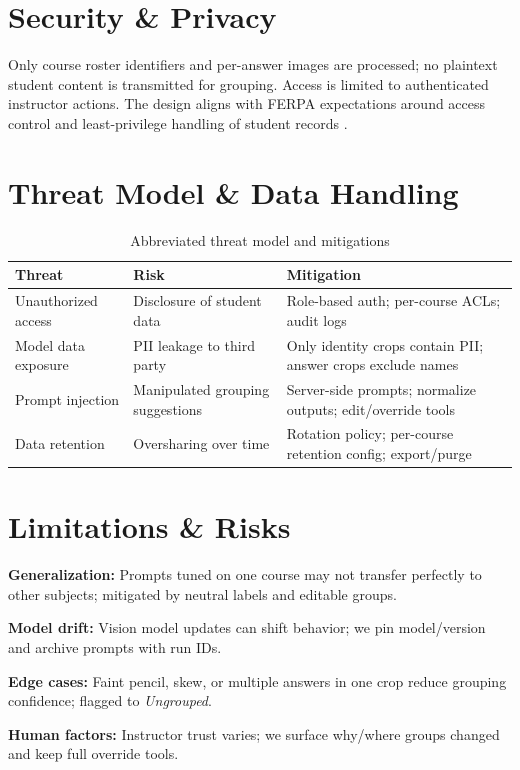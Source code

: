 \documentclass[ms,twoside,print]{nuthesis}
\begin{document}
\section{Security \& Privacy}
Only course roster identifiers and per-answer images are processed; no plaintext student content is transmitted for grouping. Access is limited to authenticated instructor actions. The design aligns with FERPA expectations around access control and least-privilege handling of student records \cite{FERPA1974}.

\section{Threat Model \& Data Handling}
\begin{table}[H]\centering
\caption{Abbreviated threat model and mitigations}\label{tab:threats}
\begin{tabularx}{\textwidth}{@{}p{3.8cm}Xp{4.6cm}@{}}
\toprule
\textbf{Threat} & \textbf{Risk} & \textbf{Mitigation} \\
\midrule
Unauthorized access & Disclosure of student data & Role-based auth; per-course ACLs; audit logs \\
Model data exposure & PII leakage to third party & Only identity crops contain PII; answer crops exclude names \\
Prompt injection & Manipulated grouping suggestions & Server-side prompts; normalize outputs; edit/override tools \\
Data retention & Oversharing over time & Rotation policy; per-course retention config; export/purge \\
\bottomrule
\end{tabularx}
\end{table}

\section{Limitations \& Risks}
\begin{compactitem}
  \item \textbf{Generalization:} Prompts tuned on one course may not transfer perfectly to other subjects; mitigated by neutral labels and editable groups.
  \item \textbf{Model drift:} Vision model updates can shift behavior; we pin model/version and archive prompts with run IDs.
  \item \textbf{Edge cases:} Faint pencil, skew, or multiple answers in one crop reduce grouping confidence; flagged to \emph{Ungrouped}.
  \item \textbf{Human factors:} Instructor trust varies; we surface why/where groups changed and keep full override tools.
\end{compactitem}
\end{document}
